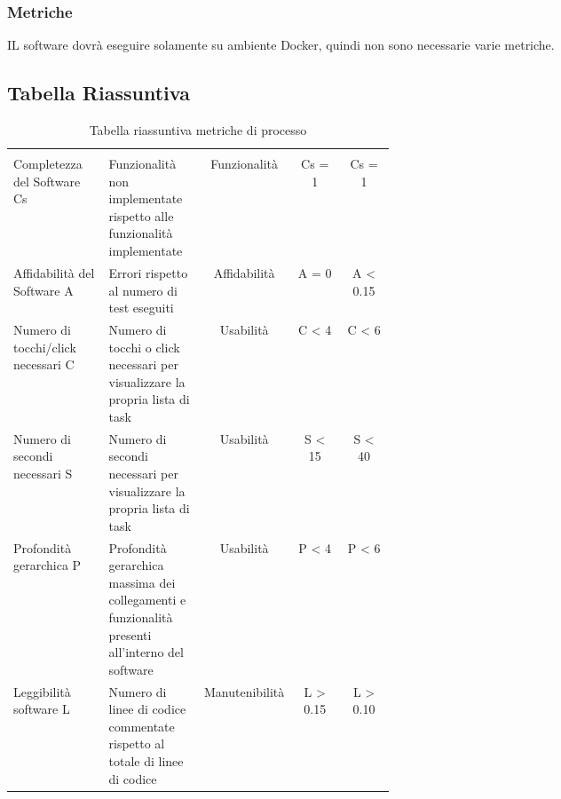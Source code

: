 \subsubsection{Metriche}
IL software dovrà eseguire solamente su ambiente Docker, quindi non sono necessarie varie metriche.
\subsection{Tabella Riassuntiva}
\begin{table}[H]
	\begin{center}
		\caption{Tabella riassuntiva metriche di processo}
		\begin{tabular}{p{0.25\linewidth} p{0.25\linewidth}c!{\color[HTML]{9b240a}\vrule width 0.05cm}cc}
			\rowcolorhead
			 &  &  &  & \\
			
			Completezza del Software Cs & Funzionalità non implementate rispetto alle funzionalità implementate & Funzionalità & Cs = 1 & Cs = 1\\
			Affidabilità del Software A & Errori rispetto al numero di test eseguiti & Affidabilità & A = 0 & A < 0.15\\
			Numero di tocchi/click necessari C & Numero di tocchi o click necessari per visualizzare la propria lista di task & Usabilità & C < 4 & C < 6\\
			Numero di secondi necessari S & Numero di secondi necessari per visualizzare la propria lista di task & Usabilità & S < 15 & S < 40\\
			Profondità gerarchica P & Profondità gerarchica massima dei collegamenti e funzionalità presenti all'interno del software & Usabilità & P < 4 & P < 6\\
			Leggibilità software L & Numero di linee di codice commentate rispetto al totale di linee di codice & Manutenibilità & L > 0.15 & L > 0.10\\
			
			
		\end{tabular}
		
	\end{center}
\end{table}
